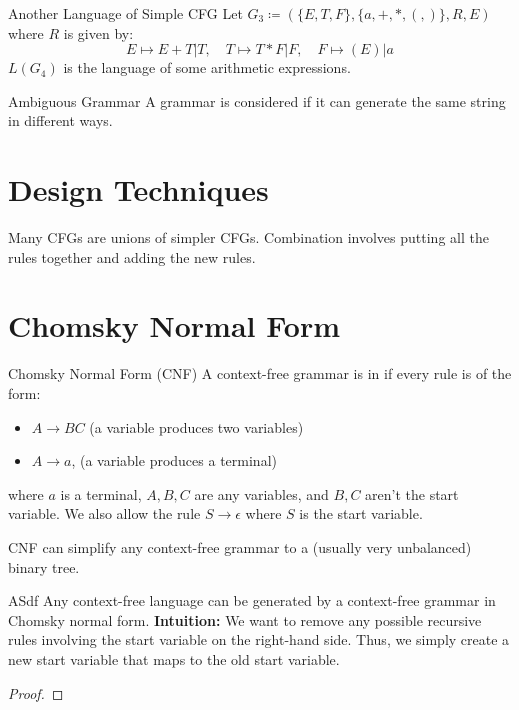 \documentclass[math]{amznotes}
\begin{document}
\begin{exbox}{Another Language of Simple CFG}{}
    Let $G_3 \coloneq (\{E,T,F\}, \{a, +, *, (, )\}, R, E)$ where $R$ is given by:
    \[ E \mapsto E + T | T,\quad T \mapsto T * F | F,\quad F \mapsto (E) | a \]
    $L(G_4)$ is the language of some arithmetic expressions.
\end{exbox}

\begin{dfnbox}{Ambiguous Grammar}{}
    A grammar is considered  if it can generate the same string in different ways.
\end{dfnbox}

\section{Design Techniques}
Many CFGs are unions of simpler CFGs. Combination involves putting all the rules together and adding the new rules.


\section{Chomsky Normal Form}

\begin{dfnbox}{Chomsky Normal Form (CNF)}{}
    A context-free grammar is in  if every rule is of the form:
    \begin{itemize}
        \item $A \to BC$ (a variable produces two variables)
        \item $A \to a$, (a variable produces a terminal)
    \end{itemize}
    where $a$ is a terminal, $A,B,C$ are any variables, and $B,C$ aren't the start variable. We also allow the rule $S \to \epsilon$ where $S$ is the start variable.
\end{dfnbox}

CNF can simplify any context-free grammar to a (usually very unbalanced) binary tree.

\begin{thmbox}{ASdf}{}
    Any context-free language can be generated by a context-free grammar in Chomsky normal form.
    \tcblower
    \textbf{Intuition:} We want to remove any possible recursive rules involving the start variable on the right-hand side. Thus, we simply create a new start variable that maps to the old start variable.

    \begin{proof}

    \end{proof}
\end{thmbox}
\end{document}
